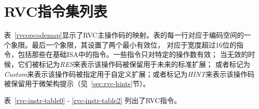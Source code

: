 \clearpage

\section{RVC指令集列表}

表~\ref{rvcopcodemap}显示了RVC主操作码的映射。表的每一行对应于编码空间的一个象限。最后一个象限，其设置了两个最小有效位，
对应于宽度超过16位的指令，包括那些在基础ISA中的指令。一些指令只对特定的操作数有效；
当无效的时候，它们被标记为{\em RES}来表示该操作码被保留用于未来的标准扩展；
或者标记为{\em Custom}来表示该操作码被指定用于自定义扩展；或者标记为{\em HINT}来表示该操作码被保留用于微架构提示（见~\ref{sec:rvc-hints}节）。



表~\ref{rvc-instr-table0} - \ref{rvc-instr-table2} 列出了RVC指令。

